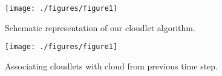 \documentclass[12pt]{article}
\begin{document}


{}
{\clearpage}




\begin{figure}[t]
  \noindent\texttt{[image: ./figures/figure1]}\\
  \caption{Schematic representation of our cloudlet algorithm.}\label{fig:figure1}
\end{figure}

\begin{figure}[t]
  \noindent\texttt{[image: ./figures/figure1]}\\
  \caption{Associating cloudlets with cloud from previous time step.}\label{fig:figure1}
\end{figure}
\end{document}
